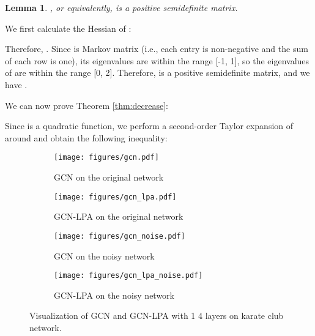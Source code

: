 \documentclass{article}
\newtheorem{lemma}{Lemma}
\newenvironment{proof}{{\noindent\it Proof.}\quad}{\hfill \par}
\begin{document}
		\begin{lemma}
		\label{lemma:4}
			, or equivalently,  is a positive semidefinite matrix.
		\end{lemma}
		
		\begin{proof}
			We first calculate the Hessian of :
			
			Therefore, .
			Since  is Markov matrix (i.e., each entry is non-negative and the sum of each row is one), its eigenvalues are within the range [-1, 1], so the eigenvalues of  are within the range [0, 2].
			Therefore,  is a positive semidefinite matrix, and we have .
		\end{proof}
		
		We can now prove Theorem \ref{thm:decrease}:
		
		\begin{proof}
			Since  is a quadratic function, we perform a second-order Taylor expansion of  around  and obtain the following inequality:
			
		\end{proof}
		
		\begin{figure}[h]
			\centering
			\begin{subfigure}[b]{\textwidth}
   				\texttt{[image: figures/gcn.pdf]}
   				\caption{GCN on the original network}
   				\label{fig:app_karate_1}
			\end{subfigure}
			\hfill
			\begin{subfigure}[b]{\textwidth}
				\texttt{[image: figures/gcn\_lpa.pdf]}
				\caption{GCN-LPA on the original network}
				\label{fig:app_karate_2}
			\end{subfigure}
			\hfill
			\begin{subfigure}[b]{\textwidth}
   				\texttt{[image: figures/gcn\_noise.pdf]}
   				\caption{GCN on the noisy network}
   				\label{fig:app_karate_3}
			\end{subfigure}
			\hfill
			\begin{subfigure}[b]{\textwidth}
				\texttt{[image: figures/gcn\_lpa\_noise.pdf]}
				\caption{GCN-LPA on the noisy network}
				\label{fig:app_karate_4}
			\end{subfigure}
			\caption{Visualization of GCN and GCN-LPA with 1  4 layers on karate club network.}
			\label{fig:app_karate}
		\end{figure}
		
	
\end{document}
